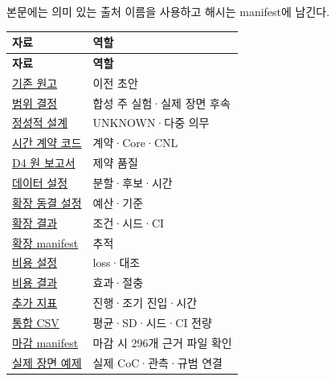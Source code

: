 \documentclass[11pt,a4paper]{article}
\begin{document}
본문에는 의미 있는 출처 이름을 사용하고 해시는 manifest에 남긴다.\par

\begingroup\small
\begin{longtable}{@{}>{\raggedright\arraybackslash}p{}>{\raggedright\arraybackslash}p{}@{}}
\toprule
\textbf{자료} & \textbf{역할} \\
\midrule\endfirsthead
\toprule
\textbf{자료} & \textbf{역할} \\
\midrule\endhead
\bottomrule\endfoot
\href{\detokenize{../../../../../../projects/04-guardsynth-coc/paper/main.tex}}{기존 원고} & 이전 초안 \\
\href{\detokenize{../../../../../../projects/04-guardsynth-coc/docs/decisions/PAPER1_METHOD_PRESERVATION_AND_LABELING_DECISION_V01.md}}{범위 결정} & 합성 주 실험·실제 장면 후속 \\
\href{\detokenize{../../../../../../projects/04-guardsynth-coc/docs/designs/PAPER1_ACTION_CONTRACT_DESIGN_V01.md}}{정성적 설계} & UNKNOWN·다중 의무 \\
\href{\detokenize{../../../../../../projects/04-guardsynth-coc/experiments/paper1_cnl_learning/temporal_preservation.py}}{시간 계약 코드} & 계약·Core·CNL \\
\href{\detokenize{../../paper1-temporal-diversity-001/diversity-analysis-2026-09-29-001/REPORT_KO.md}}{D4 원 보고서} & 제약 품질 \\
\href{\detokenize{../temporal-training-data-2026-09-29-001/protocol.json}}{데이터 설정} & 분할·후보·시간 \\
\href{\detokenize{../temporal-expansion-protocol-2026-09-29-001/protocol.json}}{확장 동결 설정} & 예산·기준 \\
\href{\detokenize{../temporal-expansion-learning-2026-09-29-001/RESULT.json}}{확장 결과} & 조건·시드·CI \\
\href{\detokenize{../temporal-expansion-learning-2026-09-29-001/RUN_MANIFEST.json}}{확장 manifest} & 추적 \\
\href{\detokenize{../temporal-cost-protocol-2026-09-29-001/protocol.json}}{비용 설정} & loss·대조 \\
\href{\detokenize{../temporal-cost-learning-2026-09-29-001/REPORT_KO.md}}{비용 결과} & 효과·절충 \\
\href{\detokenize{../temporal-secondary-metrics-2026-09-29-001/REPORT_KO.md}}{추가 지표} & 진행·조기 진입·시간 \\
\href{\detokenize{../temporal-experiment-closure-2026-09-29-001/all_primary_metrics.csv}}{통합 CSV} & 평균·SD·시드·CI 전량 \\
\href{\detokenize{../temporal-experiment-closure-2026-09-29-001/RUN_MANIFEST.json}}{마감 manifest} & 마감 시 296개 근거 파일 확인 \\
\href{\detokenize{../../../../../../projects/04-guardsynth-coc/paper/examples/SCENE18_PIPELINE_EXAMPLE_REPORT_V01.md}}{실제 장면 예제} & 실제 CoC·관측·규범 연결 \\
\end{longtable}
\endgroup
\end{document}
